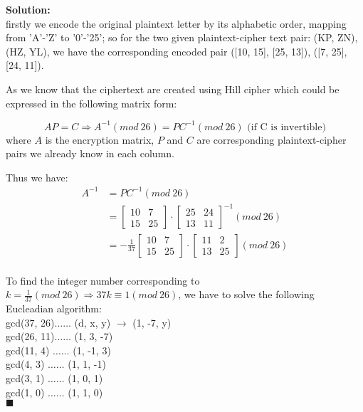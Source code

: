 \documentclass{article}
\newenvironment{solution}                               %
{\textbf{Solution:} \\}{$\blacksquare$\newline}         %
\newcommand{\leadto}{\Rightarrow}                       %
\begin{document}
    \begin{solution}
        firstly we encode the original plaintext letter by its alphabetic order, mapping from 'A'-'Z' to '0'-'25'; so for the two given plaintext-cipher text pair: (KP, ZN), (HZ, YL), we have the corresponding encoded pair ([10, 15], [25, 13]), ([7, 25], [24, 11]).

        As we know that the ciphertext are created using Hill cipher which could be expressed in the following matrix form:

        $$
            AP = C \leadto A^{-1} (mod\ 26) = P C^{-1} (mod\ 26)\text{ (if C is invertible)}
        $$
        where $A$ is the encryption matrix, $P$ and $C$ are corresponding plaintext-cipher pairs we already know in each column.

        Thus we have:
        \begin{align*}
            A^{-1} &= P C^{-1} (mod\ 26) \\
            &=  
                \begin{bmatrix}
                    10 & 7 \\
                    15 & 25
                \end{bmatrix}
                \cdot
                \begin{bmatrix}
                    25 & 24 \\
                    13 & 11
                \end{bmatrix}^{-1} (mod\ 26) \\
            &=  -\frac{1}{37}
                \begin{bmatrix}
                    10 & 7 \\
                    15 & 25
                \end{bmatrix}
                \cdot
                \begin{bmatrix}
                    11 & 2 \\
                    13 & 25
                \end{bmatrix} (mod\ 26) \\    
        \end{align*}

        To find the integer number corresponding to $k=\frac{1}{37} (mod\ 26) \leadto 37k \equiv 1 (mod\ 26)$, we have to solve the following Eucleadian algorithm: \\
        gcd(37, 26)$\dots\dots$ (d, x, y) $\rightarrow$ (1, -7, y)\\
        gcd(26, 11)$\dots\dots$ (1, 3, -7)\\
        gcd(11, 4) $\dots\dots$ (1, -1, 3)\\
        gcd(4, 3)  $\dots\dots$ (1, 1, -1)\\
        gcd(3, 1)  $\dots\dots$ (1, 0, 1)\\
        gcd(1, 0)  $\dots\dots$ (1, 1, 0)\\


\end{solution}
\end{document}
